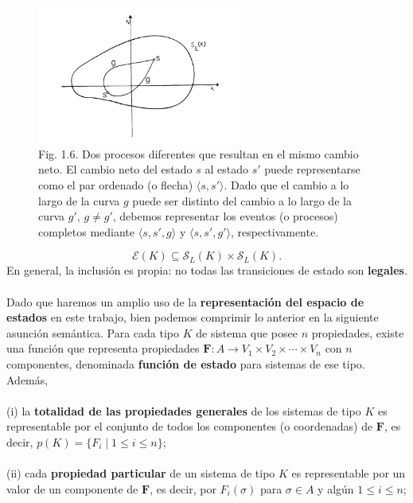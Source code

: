 {\fontsize{13}{15}\selectfont
\begin{figure}[h!]
    \centering
    \includegraphics[width=0.6\textwidth]{imagenes/figura1.6.png}
    \caption*{Fig. 1.6. Dos procesos diferentes que resultan en el mismo cambio neto. El cambio neto del estado $s$ al estado $s'$ puede representarse como el par ordenado (o flecha) $\langle s, s' \rangle$. Dado que el cambio a lo largo de la curva $g$ puede ser distinto del cambio a lo largo de la curva $g'$, $g \neq g'$, debemos representar los eventos (o procesos) completos mediante $\langle s, s', g \rangle$ y $\langle s, s', g' \rangle$, respectivamente.}
\end{figure}
$$ \mathcal{E}(K) \subseteq \mathcal{S}_L(K) \times \mathcal{S}_L(K). $$En general, la inclusión es propia: no todas las transiciones de estado son \textbf{legales}.
\\
\\
Dado que haremos un amplio uso de la \textbf{representación del espacio de estados} en este trabajo, bien podemos comprimir lo anterior en la siguiente asunción semántica. Para cada tipo $K$ de sistema que posee $n$ propiedades, existe una función que representa propiedades $\mathbf{F}: A \longrightarrow V_1 \times V_2 \times \cdots \times V_n$ con $n$ componentes, denominada \textbf{función de estado} para sistemas de ese tipo. Además,
\\\\
(i) la \textbf{totalidad de las propiedades generales} de los sistemas de tipo $K$ es representable por el conjunto de todos los componentes (o coordenadas) de $\mathbf{F}$, es decir, $p(K) = \{F_i \mid 1 \le i \le n\}$;
\\\\
(ii) cada \textbf{propiedad particular} de un sistema de tipo $K$ es representable por un valor de un componente de $\mathbf{F}$, es decir, por $F_i(\sigma)$ para $\sigma \in A$ y algún $1 \le i \le n$;
\\\\
}
